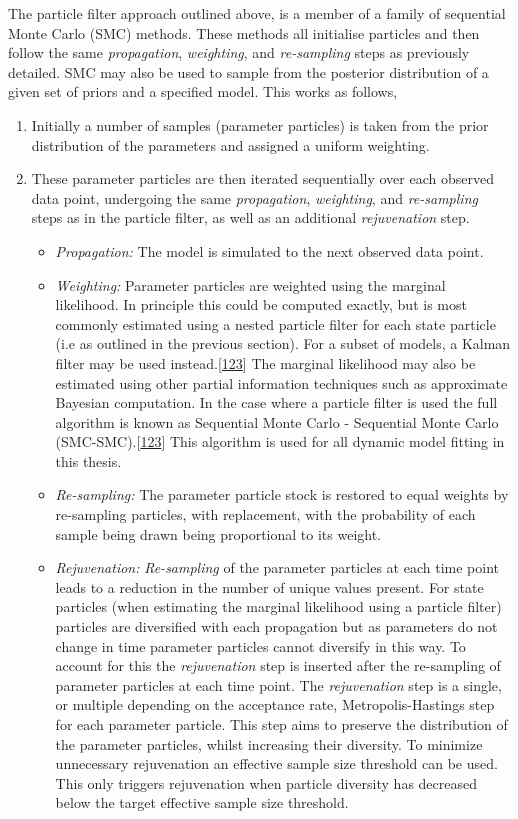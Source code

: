 \documentclass[11pt,twoside]{bristolthesis}
\begin{document}
  The particle filter approach outlined above, is a member of a family of sequential Monte Carlo (SMC) methods. These methods all initialise particles and then follow the same \emph{propagation}, \emph{weighting}, and \emph{re-sampling} steps as previously detailed. SMC may also be used to sample from the posterior distribution of a given set of priors and a specified model. This works as follows,
  \begin{enumerate}
  \def\labelenumi{\arabic{enumi}.}
  \item
    Initially a number of samples (parameter particles) is taken from the prior distribution of the parameters and assigned a uniform weighting.
  \item
    These parameter particles are then iterated sequentially over each observed data point, undergoing the same \emph{propagation}, \emph{weighting}, and \emph{re-sampling} steps as in the particle filter, as well as an additional \emph{rejuvenation} step.
    \begin{itemize}
    \item
      \emph{Propagation:} The model is simulated to the next observed data point.
    \item
      \emph{Weighting:} Parameter particles are weighted using the marginal likelihood. In principle this could be computed exactly, but is most commonly estimated using a nested particle filter for each state particle (i.e as outlined in the previous section). For a subset of models, a Kalman filter may be used instead.{[}\protect\hyperlink{ref-Murray2015}{123}{]} The marginal likelihood may also be estimated using other partial information techniques such as approximate Bayesian computation. In the case where a particle filter is used the full algorithm is known as Sequential Monte Carlo - Sequential Monte Carlo (SMC-SMC).{[}\protect\hyperlink{ref-Murray2015}{123}{]} This algorithm is used for all dynamic model fitting in this thesis.
    \item
      \emph{Re-sampling:} The parameter particle stock is restored to equal weights by re-sampling particles, with replacement, with the probability of each sample being drawn being proportional to its weight.
    \item
      \emph{Rejuvenation:} \emph{Re-sampling} of the parameter particles at each time point leads to a reduction in the number of unique values present. For state particles (when estimating the marginal likelihood using a particle filter) particles are diversified with each propagation but as parameters do not change in time parameter particles cannot diversify in this way. To account for this the \emph{rejuvenation} step is inserted after the re-sampling of parameter particles at each time point. The \emph{rejuvenation} step is a single, or multiple depending on the acceptance rate, Metropolis-Hastings step for each parameter particle. This step aims to preserve the distribution of the parameter particles, whilst increasing their diversity. To minimize unnecessary rejuvenation an effective sample size threshold can be used. This only triggers rejuvenation when particle diversity has decreased below the target effective sample size threshold.
    \end{itemize}
  \end{enumerate}
\end{document}
